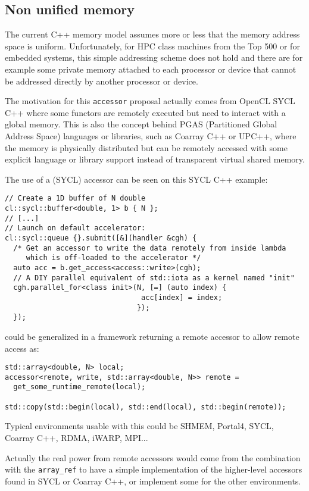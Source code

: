 \documentclass[a4paper]{article}
\begin{document}
\subsection{Non unified memory}
\label{sec:non-unified-memory}

The current C++ memory model assumes more or less that the memory
address space is uniform. Unfortunately, for HPC class machines from
the Top 500 or for embedded systems, this simple addressing scheme
does not hold and there are for example some private memory attached
to each processor or device that cannot be addressed directly by
another processor or device.

The motivation for this \lstinline|accessor| proposal actually comes
from OpenCL SYCL C++ where some functors are remotely executed but need
to interact with a global memory. This is also the concept behind PGAS
(Partitioned Global Address Space) languages or libraries, such as
Coarray C++ or UPC++, where the memory is physically distributed but
can be remotely accessed with some explicit language or library
support instead of transparent virtual shared memory.

The use of a (SYCL) accessor can be seen on this SYCL C++ example:
\begin{lstlisting}
// Create a 1D buffer of N double
cl::sycl::buffer<double, 1> b { N };
// [...]
// Launch on default accelerator:
cl::sycl::queue {}.submit([&](handler &cgh) {
  /* Get an accessor to write the data remotely from inside lambda
     which is off-loaded to the accelerator */
  auto acc = b.get_access<access::write>(cgh);
  // A DIY parallel equivalent of std::iota as a kernel named "init"
  cgh.parallel_for<class init>(N, [=] (auto index) {
                                acc[index] = index;
                               });
  });
\end{lstlisting}

could be generalized in a framework returning a remote accessor to
allow remote access as:
\begin{lstlisting}
std::array<double, N> local;
accessor<remote, write, std::array<double, N>> remote =
  get_some_runtime_remote(local);

std::copy(std::begin(local), std::end(local), std::begin(remote));
\end{lstlisting}

Typical environments usable with this could be SHMEM, Portal4, SYCL,
Coarray C++, RDMA, iWARP, MPI...

Actually the real power from remote accessors would come from the
combination with the \lstinline|array_ref|
\cite{C++:P0009R1:array_ref} to have a simple implementation of the
higher-level accessors found in SYCL or Coarray C++, or implement some
for the other environments.
\end{document}
